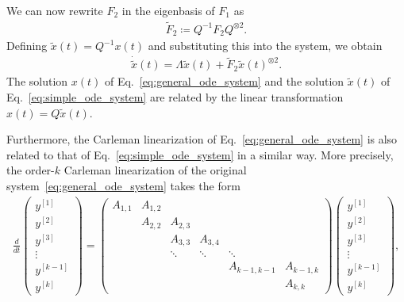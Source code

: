 \documentclass[superscriptaddress,onecolumn,nofootinbib,longbibliography,a4paper,accepted=2026-09-29]{quantumarticle}
\theoremstyle{plain}
\theoremstyle{definition}
\numberwithin{thm}{section}
\numberwithin{assumption}{section}
\numberwithin{lemma}{section}
\numberwithin{prop}{section}
\numberwithin{cor}{section}
\numberwithin{definition}{section}
\numberwithin{rmk}{section}
\numberwithin{equation}{section}
\newcommand{\defeq}{\coloneqq}
\begin{document}
We can now rewrite $F_2$ in the eigenbasis of $F_1$ as 
\begin{align}
    \tilde{F}_2 \defeq Q^{-1} F_2 Q^{\otimes 2}.  
\end{align}
Defining $\tilde{x}(t)=Q^{-1}x(t)$ and substituting this into the system, we obtain
\begin{align}
 \dot{\tilde{x}}(t) = \Lambda \tilde{x}(t) + \tilde{F}_2 \tilde{x}(t)^{\otimes 2}.   
 \label{eq:simple_ode_system}
\end{align}
The solution $x(t)$ of Eq.~\eqref{eq:general_ode_system} and the solution $\tilde{x}(t)$ of Eq.~\eqref{eq:simple_ode_system} are related by the linear transformation $x(t)=Q \tilde{x}(t)$. 

Furthermore, the Carleman linearization of Eq.~\eqref{eq:general_ode_system} is also related to that of Eq.~\eqref{eq:simple_ode_system} in a similar way. More precisely,  the order-$k$ Carleman linearization of the original system~\eqref{eq:general_ode_system} takes the form
\begin{align}
    \frac{d}{dt}\begin{pmatrix}
    y^{[1]} \\
    y^{[2]} \\
    y^{[3]} \\
    \vdots \\
    y^{[k-1]} \\
    y^{[k]}
    \end{pmatrix}=\begin{pmatrix}
    A_{1,1} & A_{1,2} & & & &\\
     & A_{2,2} & A_{2,3} & & &\\
            &  & A_{3,3} & A_{3,4} &       & \\
            &         & \ddots   & \ddots   & \ddots & \\
            &         &         &  &A_{k-1,k-1}  & A_{k-1,k}\\      
            &         &         &         &   & A_{k,k}
    \end{pmatrix}\begin{pmatrix}
    y^{[1]} \\
    y^{[2]} \\
    y^{[3]} \\
    \vdots \\
    y^{[k-1]} \\
    y^{[k]}
    \end{pmatrix},      
    \label{eq:carleman_linearization_def}
\end{align}
\end{document}
